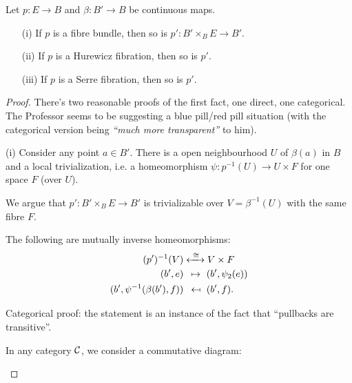 \begin{theorem}
Let $p:E\to B$ and $\beta:B'\to B$ be continuous maps.
\begin{itemize}
    \item[(i)] If $p$ is a fibre bundle, then so is $p':B'\times_B E\to B'$.
    \item[(ii)] If $p$ is a Hurewicz fibration, then so is $p'$.
    \item[(iii)] If $p$ is a Serre fibration, then so is $p'$.
\end{itemize}
\end{theorem}

\begin{proof}There's two reasonable proofs of the first fact, one direct, one categorical. The Professor seems to be suggesting a blue pill/red pill situation (with the categorical version being \emph{\enquote{much more transparent}} to him).

(i) Consider any point $a\in B'$. There is a open neighbourhood $U$ of $\beta(a)$ in $B$ and a local trivialization, i.e. a homeomorphism $\psi:p^{-1}(U)\to U\times F$ for one space $F$ (over $U$).

We argue that $p':B'\times_B E\to B'$ is trivializable over $V=\beta^{-1}(U)$ with the same fibre $F$.

The following are mutually inverse homeomorphisms:
\begin{align*}
    (p')^{-1}(V)&\xleftrightarrow{\ \cong\ }V\times F\\
    (b',e)&\ \,\mapsto\ (b',\psi_2(e))\\
    (b',\psi^{-1}(\beta(b'),f))&\ \,\mapsfrom\ (b',f).
\end{align*}

Categorical proof: the statement is an instance of the fact that \enquote{pullbacks are transitive}.

In any category $\mathcal{C}$, we consider a commutative diagram:
\begin{center}
\end{center}


\end{proof}
